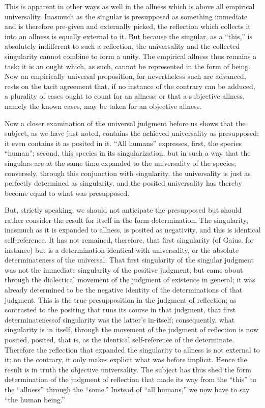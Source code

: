 This is apparent in other ways as well in the allness
which is above all empirical universality.
Inasmuch as the singular is presupposed as something immediate
and is therefore pre-given and externally picked,
the reflection which collects it into an allness is
equally external to it.
But because the singular, as a “this,” is
absolutely indifferent to such a reflection,
the universality and the collected singularity
cannot combine to form a unity.
The empirical allness thus remains a task;
it is an ought which, as such,
cannot be represented  in the form of being.
Now an empirically universal proposition,
for nevertheless such are advanced,
rests on the tacit agreement that,
if no instance of the contrary can be adduced,
a plurality of cases ought to count for an allness;
or that a subjective allness,
namely the known cases,
may be taken for an objective allness.

Now a closer examination of
the universal judgment before us shows
that the subject, as we have just noted,
contains the achieved universality as presupposed;
it even contains it as posited in it.
“All humans” expresses, first, the species “human”;
second, this species in its singularization,
but in such a way that the singulars are at the same time
expanded to the universality of the species;
conversely, through this conjunction with singularity,
the universality is just as perfectly determined as singularity,
and the posited universality has thereby
become equal to what was presupposed.

But, strictly speaking, we should not anticipate the presupposed
but should rather consider the result for itself
in the form determination.
The singularity, inasmuch as it is expanded to allness,
is posited as negativity,
and this is identical self-reference.
It has not remained, therefore, that first singularity
(of Gaius, for instance)
but is a determination identical with universality,
or the absolute determinateness of the universal.
That first singularity of the singular judgment was not
the immediate singularity of the positive judgment,
but came about through the dialectical movement of
the judgment of existence in general;
it was already determined to be the negative identity of
the determinations of that judgment.
This is the true presupposition in the judgment of reflection;
as contrasted to the positing that runs its course in that judgment,
that first determinatenessof singularity was the latter's in-itself;
consequently, what singularity is in itself,
through the movement of the judgment of reflection is now posited,
posited, that is, as the identical self-reference of the determinate.
Therefore the reflection that expanded
the singularity to allness is not external to it;
on the contrary, it only makes explicit what was before implicit.
Hence the result is in truth the objective universality.
The subject has thus shed the form determination of the judgment of reflection
that made its way from the “this” to the “allness” through the “some.”
Instead of “all humans,” we now have to say “the human being.”

